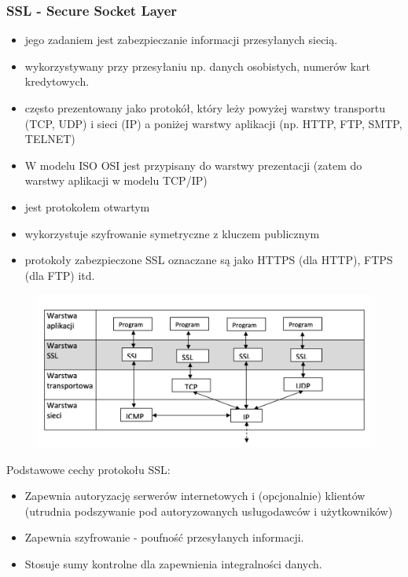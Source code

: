 \documentclass[../main.tex]{subfiles}
\begin{document}
\subsubsection{SSL - Secure Socket Layer}
\begin{itemize}
    \item jego zadaniem jest zabezpieczanie informacji przesyłanych siecią.
    \item wykorzystywany przy przesyłaniu np. danych osobistych, numerów kart kredytowych.
    \item często prezentowany jako protokół, który leży
    powyżej warstwy transportu (TCP, UDP) i sieci (IP) a poniżej warstwy aplikacji (np. HTTP, FTP,
    SMTP, TELNET)
    \item W modelu ISO OSI jest przypisany do warstwy prezentacji (zatem do
    warstwy aplikacji w modelu TCP/IP)
    \item jest protokołem otwartym
    \item wykorzystuje szyfrowanie symetryczne z kluczem publicznym
    \item protokoły zabezpieczone SSL oznaczane są jako HTTPS (dla HTTP), FTPS (dla FTP) itd.
\end{itemize}

\begin{figure}[H]
    \includegraphics[width=\linewidth]{ssl.png}
\end{figure}

Podstawowe cechy protokołu SSL:
\begin{itemize}
    \item Zapewnia autoryzację serwerów internetowych i (opcjonalnie) klientów (utrudnia
    podszywanie pod autoryzowanych usługodawców i użytkowników)
    \item Zapewnia szyfrowanie - poufność przesyłanych informacji.
    \item Stosuje sumy kontrolne dla zapewnienia integralności danych.
\end{itemize}
\end{document}
